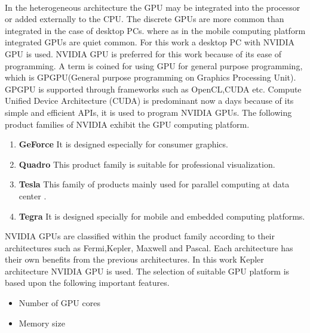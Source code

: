\paragraph*{} In the heterogeneous architecture the GPU may be integrated into the processor or added externally to the CPU. The discrete GPUs are more common than integrated in the case of desktop PCs. where as in the mobile computing platform integrated GPUs are quiet common. For this work a desktop PC with NVIDIA GPU is used. NVIDIA GPU is preferred for this work because of its ease of programming. A term is coined for using GPU for general purpose programming, which is GPGPU(General purpose programming on Graphics Processing Unit). GPGPU is supported through frameworks such as OpenCL,CUDA etc. Compute Unified Device Architecture (CUDA) is predominant now a days because of its simple and efficient APIs, it is used to program NVIDIA GPUs. The following product families of NVIDIA exhibit the GPU computing platform.
\begin{enumerate} 
\item \textbf{GeForce} \hfill \break It is designed especially for consumer graphics.
\item \textbf{Quadro} \hfill \break This product family is suitable for professional visualization.
\item \textbf{Tesla} \hfill \break This family of products mainly used for parallel computing at data center .
\item \textbf{Tegra} \hfill \break It is designed specially for mobile and embedded computing platforms.
\end{enumerate}
NVIDIA GPUs are classified within the product family according to their architectures such as Fermi,Kepler, Maxwell and Pascal. Each architecture has their own benefits from the previous architectures. In this work Kepler architecture NVIDIA GPU is used. The selection of suitable GPU platform is based upon the following important features.

\begin{itemize}
\item Number of GPU cores
\item Memory size
\end{itemize}

